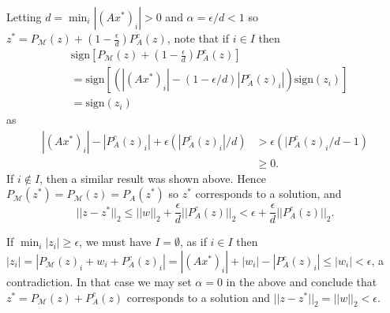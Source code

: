 \documentclass[journal]{IEEEtran}
\theoremstyle{definition}
\theoremstyle{remark}
\theoremstyle{definition}
\theoremstyle{problem}
\theoremstyle{definition}
\newcommand{\sign}{\text{sign}}
\newcommand{\MM}{\mathcal{M}}
\begin{document}
Letting $d = \min_i|(Ax^*)_i| > 0$ and $\alpha = \epsilon/d<1$ so $z^* = P_{\MM}(z) + (1-\frac{\epsilon}{d})P_A^c(z)$, note that if $i\in I$ then
\[\begin{aligned}
&\sign\left[P_{\MM}(z) + (1-\frac{\epsilon}{d})P_A^c(z)\right] \\&= \sign\left[(|(Ax^*)_i|-(1-\epsilon/d)|P_A^c(z)_i|)\sign(z_i)\right] \\&= \sign(z_i)
\end{aligned}\]
as
\[\begin{aligned}
|(Ax^*)_i|-|P_A^c(z)_i|+\epsilon(|P_A^c(z)_i|/d)&>\epsilon\left(|P_A^c(z)_i/d - 1\right) \\& \geq 0.
\end{aligned}\]
 If $i\notin I$, then a similar result was shown above. Hence $P_{\MM}(z^*)=P_{\MM}(z) = P_A(z^*)$ so $z^*$ corresponds to a solution, and
\[||z-z^*||_2 \leq ||w||_2 + \frac{\epsilon}{d}||P_A^c(z)||_2 < \epsilon + \frac{\epsilon}{d}||P_A^c(z)||_2.\]

If $\min_i|z_i|\geq\epsilon$, we must have $I=\emptyset$, as if $i\in I$ then $|z_i| = |P_{\MM}(z)_i+w_i+P_A^c(z)_i|=|(Ax^*)_i| + |w_i| - |P_A^c(z)_i|\leq |w_i|<\epsilon$, a contradiction. In that case we may set $\alpha=0$ in the above and conclude that $z^* = P_{\MM}(z) + P_A^c(z)$ corresponds to a solution and $||z-z^*||_2 = ||w||_2<\epsilon$. 





\end{document}
